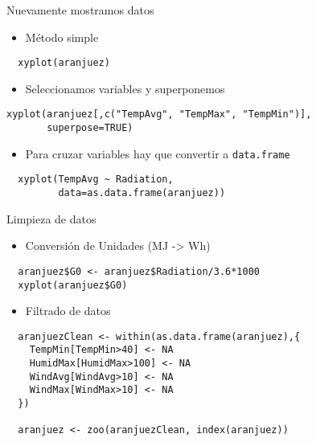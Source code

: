 \documentclass[xcolor={usenames,svgnames,dvipsnames}]{beamer}
\begin{document}
\begin{frame}[fragile,label=sec-2-4]{Nuevamente mostramos datos}
 \begin{itemize}
\item Método simple
\end{itemize}
\lstset{language=R,label= ,caption= ,numbers=none}
\begin{lstlisting}
  xyplot(aranjuez)
\end{lstlisting}
\begin{itemize}
\item Seleccionamos variables y superponemos
\end{itemize}
\lstset{language=R,label= ,caption= ,numbers=none}
\begin{lstlisting}
xyplot(aranjuez[,c("TempAvg", "TempMax", "TempMin")],
       superpose=TRUE)
\end{lstlisting}
\begin{itemize}
\item Para cruzar variables hay que convertir a \texttt{data.frame}
\end{itemize}
\lstset{language=R,label= ,caption= ,numbers=none}
\begin{lstlisting}
  xyplot(TempAvg ~ Radiation,
         data=as.data.frame(aranjuez))
\end{lstlisting}
\end{frame}

\begin{frame}[fragile,label=sec-2-5]{Limpieza de datos}
 \begin{itemize}
\item Conversión de Unidades (MJ -> Wh)
\end{itemize}
\lstset{language=R,label= ,caption= ,numbers=none}
\begin{lstlisting}
  aranjuez$G0 <- aranjuez$Radiation/3.6*1000
  xyplot(aranjuez$G0)
\end{lstlisting}
\begin{itemize}
\item Filtrado de datos
\end{itemize}
\lstset{language=R,label= ,caption= ,numbers=none}
\begin{lstlisting}
  aranjuezClean <- within(as.data.frame(aranjuez),{
    TempMin[TempMin>40] <- NA
    HumidMax[HumidMax>100] <- NA
    WindAvg[WindAvg>10] <- NA
    WindMax[WindMax>10] <- NA
  })
  
  aranjuez <- zoo(aranjuezClean, index(aranjuez))
\end{lstlisting}
\end{frame}
\end{document}
